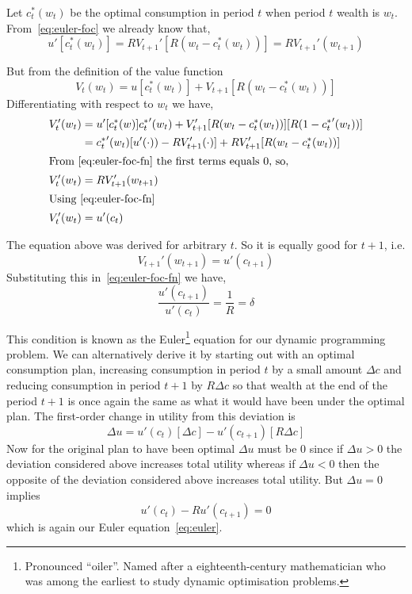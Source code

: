 \documentclass[12pt,reqno]{amsart}
\begin{document}
Let $c_t^*(w_t)$ be the optimal consumption in period $t$ when period
$t$ wealth is $w_t$. From~\eqref{eq:euler-foc} we already know that,
\begin{equation}\label{eq:euler-foc-fn}
u'[c_t^*(w_t)]=RV_{t+1}'[R(w_t-c_t^*(w_t))]=RV_{t+1}'(w_{t+1})
\end{equation}

\pagebreak

But from the definition of the value function
\[V_t(w_t) = u[c_t^*(w_t)]+V_{t+1}[R(w_t-c_t^*(w_t))]\]
Differentiating with respect to $w_t$ we have,
\begin{align*}
V_t'(w_t) &=
u'[c_t^*(w)]{c_t^*}'(w_t)
+V_{t+1}'[R(w_t-c_t^*(w_t))][R(1-{c_t^*}'(w_t))]\\
&={c_t^*}'(w_t)[u'(\cdot))-RV_{t+1}'(\cdot)]+RV_{t+1}'[R(w_t-c_t^*(w_t))]\\
\intertext{From \eqref{eq:euler-foc-fn} the first terms equals $0$,
  so,}
V_t'(w_t)&=RV_{t+1}'(w_{t+1})\\
\intertext{Using~\eqref{eq:euler-foc-fn}}
V_t'(w_t)&=u'(c_t)
\end{align*}

The equation above was derived for arbitrary $t$. So it is equally
good for $t+1$, i.e.
\[V_{t+1}'(w_{t+1})=u'(c_{t+1})\]
Substituting this in~\eqref{eq:euler-foc-fn} we have,
\begin{equation}\label{eq:euler}
\frac{u'(c_{t+1})}{u'(c_t)}=\frac{1}{R}=\delta
\end{equation}

This condition is known as the Euler\footnote{Pronounced
  ``oiler''. Named after a eighteenth-century mathematician who was
  among the earliest to study dynamic optimisation problems.} equation for our dynamic
programming problem. We can alternatively derive it by starting out
with an optimal consumption plan, increasing consumption in period $t$
by a small amount $\Delta c$ and reducing consumption in period
$t+1$ by $R\Delta c$ so that wealth at the end of the period
$t+1$ is once again the same as what it would have been under the
optimal plan. The first-order change in utility from this deviation is
\[\Delta u=u'(c_t)[\Delta c]-u'(c_{t+1})[R\Delta c]\]
Now for the original plan to have been optimal $\Delta u$ must be $0$
since if $\Delta u>0$ the deviation considered above increases total
utility whereas if $\Delta u<0$ then the opposite of the deviation
considered above increases total utility. But $\Delta u=0$ implies 
\[u'(c_t)-Ru'(c_{t+1})=0\]
which is again our Euler equation~\eqref{eq:euler}.
\end{document}
